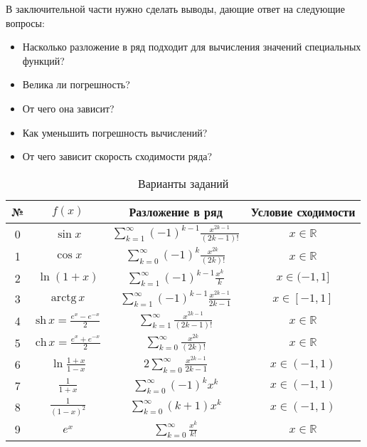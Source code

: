 В заключительной части нужно сделать выводы, дающие ответ на следующие
вопросы:
\begin{itemize}
\item Насколько разложение в ряд подходит для вычисления значений
  специальных функций?
\item Велика ли погрешность?
\item От чего она зависит?
\item Как уменьшить погрешность вычислений?
\item От чего зависит скорость сходимости ряда? 
\end{itemize}

\begin{table}
  \begin{centering}
    \begin{tabular}{|c|c|c|c|}
      \hline № & $f(x)$ & Разложение в ряд & Условие сходимости\\
      \hline
      \hline
      0\vphantom{$\Biggl(\Biggr)$} & $\sin x$ & $\sum_{k=1}^{\infty}(-1)^{k-1}\frac{x^{2k-1}}{(2k-1)!}$ &
      $x\in\mathbb{R}$ \\
      \hline
      1\vphantom{$\Biggl(\Biggr)$} &
      $\cos x$ & $\sum_{k=0}^{\infty}(-1)^{k}\frac{x^{2k}}{(2k)!}$ &
      $x\in\mathbb{R}$\tabularnewline \hline 2\vphantom{$\Biggl(\Biggr)$} &
      $\ln(1+x)$ & $\sum_{k=1}^{\infty}(-1)^{k-1}\frac{x^{k}}{k}$ &
      $x\in(-1,1]$\tabularnewline \hline 3\vphantom{$\Biggl(\Biggr)$} &
        $\mathrm{arctg}\, x$ &
        $\sum_{k=1}^{\infty}(-1)^{k-1}\frac{x^{2k-1}}{2k-1}$ &
        $x\in[-1,1]$\tabularnewline \hline 4\vphantom{$\Biggl(\Biggr)$} &
        $\mathrm{sh}\, x=\frac{e^{x}-e^{-x}}{2}$ &
        $\sum_{k=1}^{\infty}\frac{x^{2k-1}}{(2k-1)!}$ &
        $x\in\mathbb{R}$\tabularnewline \hline 5\vphantom{$\Biggl(\Biggr)$}
        & $\mathrm{ch}\, x=\frac{e^{x}+e^{-x}}{2}$ &
        $\sum_{k=0}^{\infty}\frac{x^{2k}}{(2k)!}$ &
        $x\in\mathbb{R}$\tabularnewline \hline 6\vphantom{$\Biggl(\Biggr)$}
        & $\ln\frac{1+x}{1-x}$ & $2\sum_{k=0}^{\infty}\frac{x^{2k-1}}{2k-1}$
        & $x\in(-1,1)$\tabularnewline \hline 7\vphantom{$\Biggl(\Biggr)$} &
        $\frac{1}{1+x}$ & $\sum_{k=0}^{\infty}(-1)^{k}x^{k}$ &
        $x\in(-1,1)$\tabularnewline \hline 8\vphantom{$\Biggl(\Biggr)$} &
        $\frac{1}{(1-x)^{2}}$ & $\sum_{k=0}^{\infty}(k+1)x^{k}$ &
        $x\in(-1,1)$\tabularnewline \hline 9\vphantom{$\Biggl(\Biggr)$} &
        $e^{x}$ & $\sum_{k=0}^{\infty}\frac{x^{k}}{k!}$ &
        $x\in\mathbb{R}$\tabularnewline \hline
    \end{tabular}
    \par\end{centering}

    \caption{Варианты заданий}
\end{table}

\Questions

